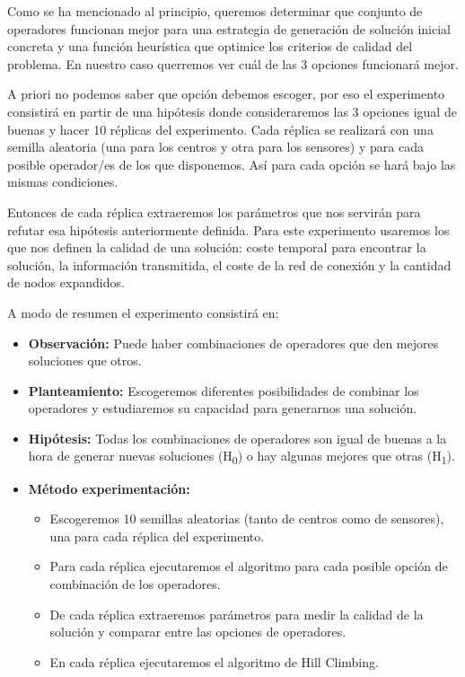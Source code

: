 \documentclass{article}
\begin{document}
\begin{enumerate}
  Como se ha mencionado al principio, queremos determinar que conjunto de operadores funcionan mejor para una estrategia de generación de solución inicial concreta y una función heurística que optimice los criterios de calidad del problema. En nuestro caso querremos ver cuál de las 3 opciones funcionará mejor.\par
  A priori no podemos saber que opción debemos escoger, por eso el experimento consistirá en partir de una hipótesis donde consideraremos las 3 opciones igual de buenas y hacer 10 réplicas del experimento. Cada réplica se realizará con una semilla aleatoria (una para los centros y otra para los sensores) y para cada posible operador/es de los que disponemos. Así para cada opción se hará bajo las mismas condiciones.\par
  Entonces de cada réplica extraeremos los parámetros que nos servirán para refutar esa hipótesis anteriormente definida. Para este experimento usaremos los que nos definen la calidad de una solución: coste temporal para encontrar la solución, la información transmitida, el coste de la red de conexión y la cantidad de nodos expandidos.

  A modo de resumen el experimento consistirá en:

  \begin{itemize}
  \item \textbf{Observación:}
  Puede haber combinaciones de operadores que den mejores soluciones que otros.
  \item \textbf{Planteamiento:}
  Escogeremos diferentes posibilidades de combinar los operadores y estudiaremos su capacidad para generarnos una solución.
  \item \textbf{Hipótesis:}
   Todas los combinaciones de operadores son igual de buenas a la hora de generar nuevas soluciones (H\textsubscript{0}) o hay algunas mejores que otras (H\textsubscript{1}).
  \item \textbf{Método experimentación:}
    \begin{itemize}
      \item Escogeremos 10 semillas aleatorias (tanto de centros como de sensores), una para cada réplica del experimento.
      \item Para cada réplica ejecutaremos el algoritmo para cada posible opción de combinación de los operadores.
      \item De cada réplica extraeremos parámetros para medir la calidad de la solución y comparar entre las opciones de operadores.
      \item En cada réplica ejecutaremos el algoritmo de Hill Climbing.
      \end{itemize}
  \end{itemize}


\end{enumerate}
\end{document}
